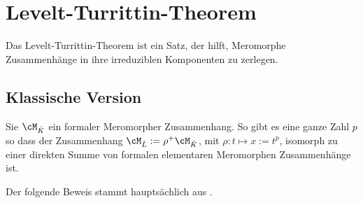 \chapter{Levelt-\!Turrittin-\!Theorem}
Das Levelt-Turrittin-Theorem ist ein Satz, der hilft, Meromorphe Zusammenhänge
in ihre irreduziblen Komponenten zu zerlegen.

\section{Klassische Version}
\begin{thm}
\cite[Thm 5.4.7]{sabbah_cimpa90}
Sie $\cM_{\hat K}$ ein formaler Meromorpher Zusammenhang. So gibt es eine
ganze Zahl $p$ so dass der Zusammenhang $\cM_{\hat L}:=\rho^+\cM_{\hat K}$,
mit $\rho:t\mapsto x:=t^p$, isomorph zu einer direkten Summe von formalen
elementaren Meromorphen Zusammenhänge
ist.
\end{thm}
Der folgende Beweis stammt hauptsächlich aus \cite[Seite 35]{sabbah_cimpa90}.
